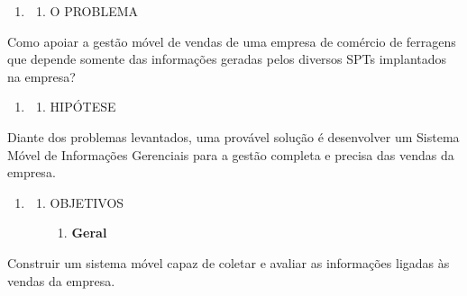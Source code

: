 \documentclass[a4paper]{article}
\newcounter{saveenum}
\newcommand\liststyleWWviiiNumi{%
\renewcommand\theenumi{\arabic{enumi}}
\renewcommand\theenumii{\arabic{enumi}.\arabic{enumii}}
\renewcommand\theenumiii{\arabic{enumi}.\arabic{enumii}.\arabic{enumiii}}
\renewcommand\theenumiv{\arabic{enumi}.\arabic{enumii}.\arabic{enumiii}.\arabic{enumiv}}
\renewcommand\labelenumi{\theenumi}
\renewcommand\labelenumii{\theenumii}
\renewcommand\labelenumiii{\theenumiii}
\renewcommand\labelenumiv{\theenumiv.}
}
\begin{document}
\bigskip

\liststyleWWviiiNumi
\setcounter{saveenum}{\value{enumi}}
\begin{enumerate}
\setcounter{enumi}{\value{saveenum}}
\item \setcounter{saveenum}{\value{enumii}}
\begin{enumerate}
\setcounter{enumii}{\value{saveenum}}
\item {\sffamily
O PROBLEMA}
\end{enumerate}
\end{enumerate}
{\sffamily
Como apoiar a gest\~ao m\'ovel de vendas de uma empresa de com\'ercio de ferragens que depende somente das
informa\c{c}\~oes geradas pelos diversos SPT{\textasciiacute}s implantados na empresa?}


\bigskip

\liststyleWWviiiNumi
\setcounter{saveenum}{\value{enumi}}
\begin{enumerate}
\setcounter{enumi}{\value{saveenum}}
\item \setcounter{saveenum}{\value{enumii}}
\begin{enumerate}
\setcounter{enumii}{\value{saveenum}}
\item {\sffamily
HIP\'OTESE}
\end{enumerate}
\end{enumerate}
{
\textsf{Diante dos problemas levantados, uma prov\'avel solu\c{c}\~ao \'e desenvolver um Sistema M\'ovel de
Informa\c{c}\~oes Gerenciais para a gest\~ao completa e precisa das vendas da empresa.}}


\bigskip

\liststyleWWviiiNumi
\setcounter{saveenum}{\value{enumi}}
\begin{enumerate}
\setcounter{enumi}{\value{saveenum}}
\item \setcounter{saveenum}{\value{enumii}}
\begin{enumerate}
\setcounter{enumii}{\value{saveenum}}
\item {\sffamily
OBJETIVOS}

\setcounter{saveenum}{\value{enumiii}}
\begin{enumerate}
\setcounter{enumiii}{\value{saveenum}}
\item {\sffamily\bfseries
Geral}
\end{enumerate}
\end{enumerate}
\end{enumerate}
{
\textsf{Construir um sistema m\'ovel capaz de coletar e avaliar as informa\c{c}\~oes ligadas \`as vendas da empresa.}}
\end{document}
